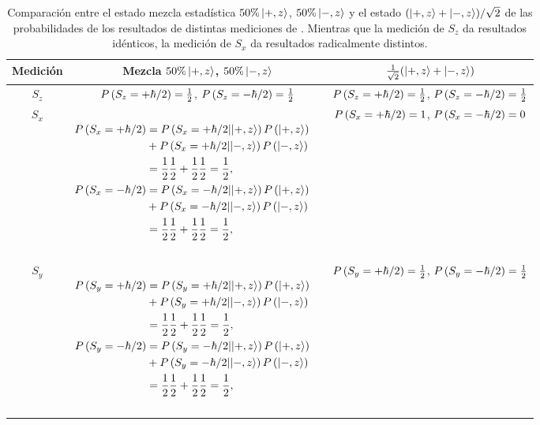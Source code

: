 \documentclass[10pt, a4paper]{article}
\numberwithin{equation}{subsection}
\begin{document}
\begin{table}[ht]
  {\renewcommand{\arraystretch}{2}%
  \begin{tabular}{| c | c | c |}
    \hline
    Medición & Mezcla $50\%\ket{+,z}$, $50\%\ket{-,z}$ &
    $\frac{1}{\sqrt{2}}(\ket{+,z} + \ket{-,z})$ \\
    \hline
    $S_z$ & $P\left({S_z=+\hbar/2}\right) = \frac{1}{2}$, $P\left({S_z=-\hbar/2}\right) =
    \frac{1}{2}$ & $P\left({S_z=+\hbar/2}\right) = \frac{1}{2}$, $P\left({S_z=-\hbar/2}\right) =
    \frac{1}{2}$ \\
    \hline
    $S_x$ & {$\begin{aligned}\;\\ P\left({S_x=+\hbar/2}\right) &=
      P\left({S_x=+\hbar/2}\middle|{\ket{+,z}}\right)P\left({\ket{+,z}}\right) \\ &+
      P\left({S_x=+\hbar/2}\middle|{\ket{-,z}}\right)P\left({\ket{-,z}}\right) \\ &=
      \frac{1}{2}\frac{1}{2} + \frac{1}{2}\frac{1}{2} = \frac{1}{2}, \\
      P\left({S_x=-\hbar/2}\right) &= P\left({S_x=-\hbar/2}\middle|{\ket{+,z}}\right)P\left({\ket{+,z}}\right)
      \\ &+ P\left({S_x=-\hbar/2}\middle|{\ket{-,z}}\right)P\left({\ket{-,z}}\right) \\ &=
      \frac{1}{2}\frac{1}{2} + \frac{1}{2}\frac{1}{2} = \frac{1}{2}, \\ \;
    \end{aligned}$} &
    $P\left({S_x=+\hbar/2}\right) = 1$, $P\left({S_x=-\hbar/2}\right) = 0$ \\
    \hline
    $S_y$ & {$\begin{aligned}\;\\ P\left({S_y=+\hbar/2}\right) &=
      P\left({S_y=+\hbar/2}\middle|{\ket{+,z}}\right)P\left({\ket{+,z}}\right) \\ &+
      P\left({S_y=+\hbar/2}\middle|{\ket{-,z}}\right)P\left({\ket{-,z}}\right) \\ &=
      \frac{1}{2}\frac{1}{2} + \frac{1}{2}\frac{1}{2} = \frac{1}{2}, \\
      P\left({S_y=-\hbar/2}\right) &= P\left({S_y=-\hbar/2}\middle|{\ket{+,z}}\right)P\left({\ket{+,z}}\right)
      \\ &+ P\left({S_y=-\hbar/2}\middle|{\ket{-,z}}\right)P\left({\ket{-,z}}\right) \\
      &= \frac{1}{2}\frac{1}{2} + \frac{1}{2}\frac{1}{2} = \frac{1}{2}, \\ \;
    \end{aligned}$} &
    $P\left({S_y=+\hbar/2}\right) = \frac{1}{2}$, $P\left({S_y=-\hbar/2}\right) = \frac{1}{2}$ \\
    \hline
  \end{tabular}}
  \caption{Comparación entre el estado mezcla estadística $50\%\ket{+,z}$,
  $50\%\ket{-,z}$ y el estado $(\ket{+,z} + \ket{-,z})/\sqrt{2}$ de las
  probabilidades de los resultados de distintas mediciones de \spin. Mientras
  que la medición de $S_z$ da resultados idénticos, la medición de $S_x$ da
  resultados radicalmente distintos.}
  \label{tab:compmezclasup}
\end{table}
\end{document}
